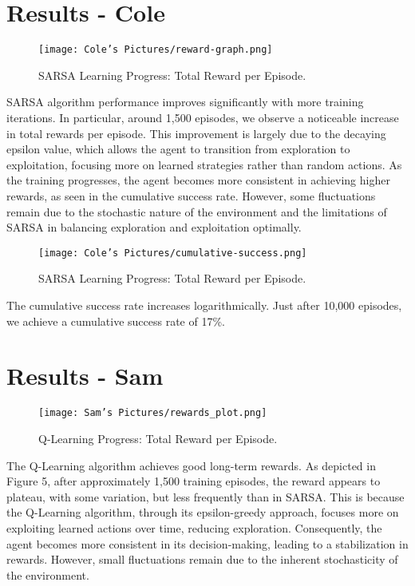 \documentclass[journal]{IEEEtran}
\begin{document}
\section{Results - Cole}

\begin{figure}[H]
    \centering
    \vspace{-1em}
    \texttt{[image: Cole's Pictures/reward-graph.png]}
    \caption{SARSA Learning Progress: Total Reward per Episode.}
    \label{fig:cole_reward}
\end{figure}

SARSA algorithm performance improves significantly with more training iterations. In particular, around 1,500 episodes, we observe a noticeable increase in total rewards per episode. This improvement is largely due to the decaying epsilon value, which allows the agent to transition from exploration to exploitation, focusing more on learned strategies rather than random actions. As the training progresses, the agent becomes more consistent in achieving higher rewards, as seen in the cumulative success rate. However, some fluctuations remain due to the stochastic nature of the environment and the limitations of SARSA in balancing exploration and exploitation optimally.

\begin{figure}[H]
    \centering
    \vspace{-1em}
    \texttt{[image: Cole's Pictures/cumulative-success.png]}
    \caption{SARSA Learning Progress: Total Reward per Episode.}
    \label{fig:cole_reward}
\end{figure}

The cumulative success rate increases logarithmically. Just after 10,000 episodes, we achieve a cumulative success rate of 17\%.

\section{Results - Sam}

\begin{figure}[H]
    \centering
    \vspace{-1em}
    \texttt{[image: Sam's Pictures/rewards\_plot.png]}
    \caption{Q-Learning Progress: Total Reward per Episode.}
    \label{fig:sam_rewards}
\end{figure}

The Q-Learning algorithm achieves good long-term rewards. As depicted in Figure 5, after approximately 1,500 training episodes, the reward appears to plateau, with some variation, but less frequently than in SARSA. This is because the Q-Learning algorithm, through its epsilon-greedy approach, focuses more on exploiting learned actions over time, reducing exploration. Consequently, the agent becomes more consistent in its decision-making, leading to a stabilization in rewards. However, small fluctuations remain due to the inherent stochasticity of the environment.
\end{document}
